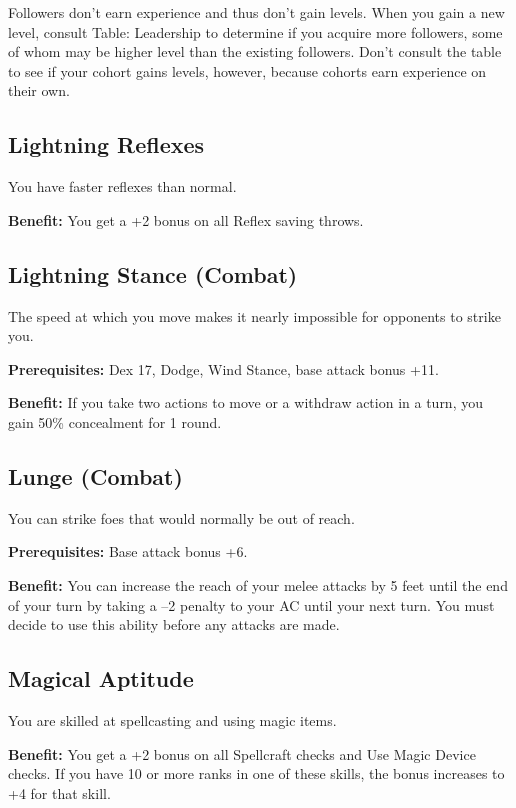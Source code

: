 Followers don't earn experience and thus don't gain levels. When you gain a new level, consult Table: Leadership to determine if you acquire more followers, some of whom may be higher level than the existing followers. Don't consult the table to see if your cohort gains levels, however, because cohorts earn experience on their own.
				
\subsection{Lightning Reflexes}

				
You have faster reflexes than normal.
				
\textbf{Benefit:} You get a +2 bonus on all Reflex saving throws.
				
\subsection{Lightning Stance (Combat)}

				
The speed at which you move makes it nearly impossible for opponents to strike you.
				
\textbf{Prerequisites:} Dex 17, Dodge, Wind Stance, base attack bonus +11.
				
\textbf{Benefit:} If you take two actions to move or a withdraw action in a turn, you gain 50\% concealment for 1 round.
				
\subsection{Lunge (Combat)}

				
You can strike foes that would normally be out of reach.
				
\textbf{Prerequisites:} Base attack bonus +6.
				
\textbf{Benefit:} You can increase the reach of your melee attacks by 5 feet until the end of your turn by taking a --2 penalty to your AC until your next turn. You must decide to use this ability before any attacks are made.
				
\subsection{Magical Aptitude}

				
You are skilled at spellcasting and using magic items.
				
\textbf{Benefit:} You get a +2 bonus on all Spellcraft checks and Use Magic Device checks. If you have 10 or more ranks in one of these skills, the bonus increases to +4 for that skill.
				
